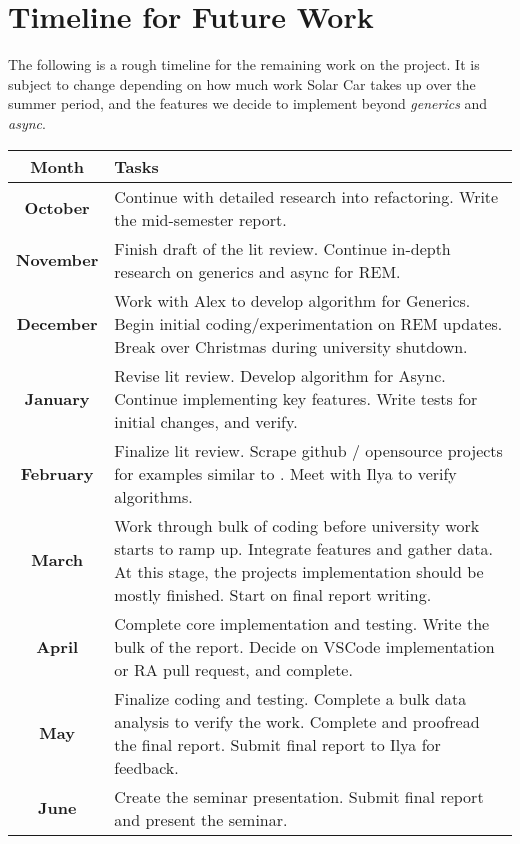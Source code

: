 \section{Timeline for Future Work}

The following is a rough timeline for the remaining work on the project. It is
subject to change depending on how much work Solar Car takes up over the summer
period, and the features we decide to implement beyond \textit{generics} and
\textit{async}.

\begin{table}[H]
    \centering
    \renewcommand{\arraystretch}{1.3}
    \begin{tabularx}{\columnwidth}{|c|X|}
        \hline
        \textbf{Month} & \textbf{Tasks} \\ \hline
        \textbf{October} &
        Continue with detailed research into refactoring. Write the mid-semester
            report. \\ \hline
        \textbf{November} &
        Finish draft of the lit review. Continue in-depth research on generics and async for REM. \\ \hline
        \textbf{December} &
        Work with Alex to develop algorithm for Generics. Begin initial
        coding/experimentation on REM updates. Break over Christmas during
        university shutdown. \\ \hline
        \textbf{January} &
        Revise lit review. Develop algorithm for Async. Continue implementing
        key features. Write tests for initial changes, and verify. \\ \hline
        \textbf{February} &
        Finalize lit review. Scrape github / opensource projects for examples
        similar to \cite{BorrowingWithoutSorrowing}. Meet with Ilya to verify
        algorithms. \\ \hline
        \textbf{March} &
        Work through bulk of coding before university work starts to ramp up.
        Integrate features and gather data. At this stage, the projects
        implementation should be mostly finished. Start on final report writing. \\
        \hline
        \textbf{April} &
        Complete core implementation and testing. Write the bulk of the report.
        Decide on VSCode implementation or RA pull request, and complete.\\ \hline
        \textbf{May} &
        Finalize coding and testing. Complete a bulk data analysis to verify the
        work. Complete and proofread the final report. Submit final report to Ilya for feedback. \\ \hline
        \textbf{June} &
        Create the seminar presentation. Submit final report and present the seminar. \\ \hline
    \end{tabularx}
 \end{table}